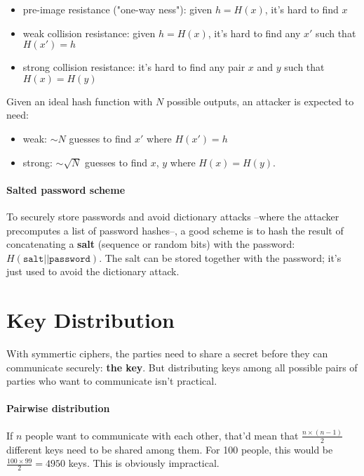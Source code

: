 \documentclass[12pt, letterpaper]{article}
\begin{document}
\begin{itemize}
  \item pre-image resistance ("one-way ness"): given $h = H(x)$, it's hard to find $x$
  \item weak collision resistance: given $h = H(x)$, it's hard to find any $x'$ such that $H(x') = h$
  \item strong collision resistance: it's hard to find any pair $x$ and $y$ such that $H(x) = H(y)$
\end{itemize}

Given an ideal hash function with $N$ possible outputs, an attacker is expected to need:
\begin{itemize}
  \item weak: $\sim N$ guesses to find $x'$ where $H(x') = h$
  \item strong: $\sim \sqrt{N}$ guesses to find $x$, $y$ where $H(x) = H(y)$.
\end{itemize}

\paragraph{Salted password scheme} To securely store passwords and avoid dictionary attacks --where the attacker precomputes a list of password hashes--,
a good scheme is to hash the result of concatenating a \textbf{salt} (sequence or random bits) with the password: $H(\mathtt{salt} || \mathtt{password})$.
The salt can be stored together with the password; it's just used to avoid the dictionary attack.


\section{Key Distribution}

With symmertic ciphers, the parties need to share a secret before they can communicate securely: \textbf{the key}.
But distributing keys among all possible pairs of parties who want to communicate isn't practical.

\paragraph{Pairwise distribution} If $n$ people want to communicate with each other, that'd mean that $\frac{n \times (n - 1)}{2}$ different keys need to be shared among them.
For 100 people, this would be $\frac{100 \times 99}{2} = 4950$ keys.
This is obviously impractical.
\end{document}

